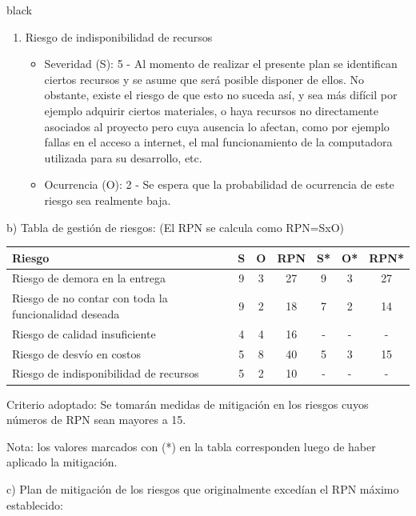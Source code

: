 \documentclass[
11pt, %
]{charter}
\begin{document}
\begin{consigna}{black}
\begin{enumerate}
\item Riesgo de indisponibilidad de recursos
\begin{itemize}
	\item Severidad (S): 5 - Al momento de realizar el presente plan se identifican ciertos recursos y se asume que será posible disponer de ellos. No obstante, existe el riesgo de que esto no suceda así, y sea más difícil por ejemplo adquirir ciertos materiales, o haya recursos no directamente asociados al proyecto pero cuya ausencia lo afectan, como por ejemplo fallas en el acceso a internet, el mal funcionamiento de la computadora utilizada para su desarrollo, etc.
	\item Ocurrencia (O): 2 - Se espera que la probabilidad de ocurrencia de este riesgo sea realmente baja.
\end{itemize}

\end{enumerate}

b) Tabla de gestión de riesgos:      (El RPN se calcula como RPN=SxO)

\begin{table}[htpb]
\centering
\begin{tabularx}{\linewidth}{@{}|X|c|c|c|c|c|c|@{}}
\hline
\rowcolor[HTML]{C0C0C0}
Riesgo 													& S & O & RPN & S* & O* & RPN* \\ \hline
Riesgo de demora en la entrega							& 9 & 3 & 27 &  9  &  3  & 27    \\ \hline
Riesgo de no contar con toda la funcionalidad deseada	& 9 & 2 & 18  & 7  & 2 &  14    \\ \hline
Riesgo de calidad insuficiente							& 4 & 4 & 16 &  - &  - &   -  \\ \hline
Riesgo de desvío en costos								& 5 & 8 & 40 & 5  & 3  &  15   \\ \hline
Riesgo de indisponibilidad de recursos					& 5 & 2 & 10 & -  & -  &   -   \\ \hline
\end{tabularx}%
\end{table}

Criterio adoptado:
Se tomarán medidas de mitigación en los riesgos cuyos números de RPN sean mayores a 15.

Nota: los valores marcados con (*) en la tabla corresponden luego de haber aplicado la mitigación.

c) Plan de mitigación de los riesgos que originalmente excedían el RPN máximo establecido:
\begin{enumerate}



\end{enumerate}
\end{consigna}
\end{document}
